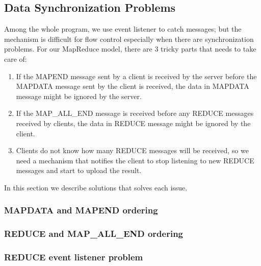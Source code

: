 \subsection{Data Synchronization Problems}

Among the whole program, we use event listener to catch messages; but the mechanism is difficult for flow control especially when there are synchronization problems. For our MapReduce model, there are 3 tricky parts that needs to take care of:

\begin{enumerate}

\item If the MAPEND message sent by a client is received by the server before the MAPDATA message sent by the client is received, the data in MAPDATA message might be ignored by the server.

\item If the MAP\_ALL\_END message is received before any REDUCE messages received by clients, the data in REDUCE message might be ignored by the client.

\item Clients do not know how many REDUCE messages will be received, so we need a mechanism that notifies the client to stop listening to new REDUCE messages and start to upload the result.

\end{enumerate}

In this section we describe solutions that solves each issue.

\subsubsection{MAPDATA and MAPEND ordering}

\subsubsection{REDUCE and MAP\_ALL\_END ordering}

\subsubsection{REDUCE event listener problem}
